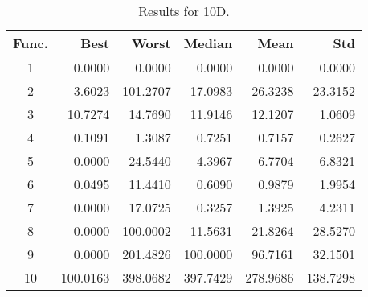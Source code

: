 \begin{table}[ht]
\centering
\caption{ Results for 10D. }
\label{tab:10D}
\begin{tabular}{crrrrr}
\hline
{Func.} & Best & Worst & Median & Mean & Std \\
\hline
1 & 0.0000 & 0.0000 & 0.0000 & 0.0000 & 0.0000 \\
2 & 3.6023 & 101.2707 & 17.0983 & 26.3238 & 23.3152 \\
3 & 10.7274 & 14.7690 & 11.9146 & 12.1207 & 1.0609 \\
4 & 0.1091 & 1.3087 & 0.7251 & 0.7157 & 0.2627 \\
5 & 0.0000 & 24.5440 & 4.3967 & 6.7704 & 6.8321 \\
6 & 0.0495 & 11.4410 & 0.6090 & 0.9879 & 1.9954 \\
7 & 0.0000 & 17.0725 & 0.3257 & 1.3925 & 4.2311 \\
8 & 0.0000 & 100.0002 & 11.5631 & 21.8264 & 28.5270 \\
9 & 0.0000 & 201.4826 & 100.0000 & 96.7161 & 32.1501 \\
10 & 100.0163 & 398.0682 & 397.7429 & 278.9686 & 138.7298 \\
\hline
\end{tabular}
\end{table}
